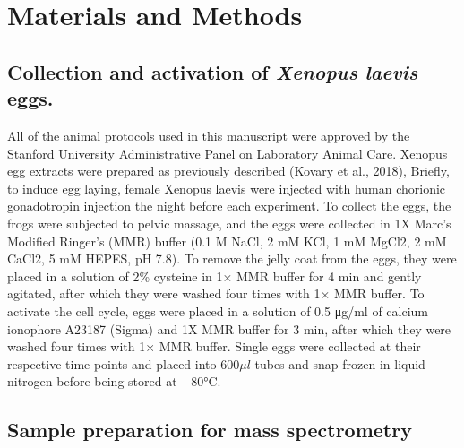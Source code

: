 \section{Materials and Methods} \label{Materials and Methods}

\subsection{Collection and activation of \emph{Xenopus laevis} eggs.}

All of the animal protocols used in this manuscript were approved by the Stanford University Administrative Panel on Laboratory Animal Care. Xenopus egg extracts were prepared as previously described (Kovary et al., 2018), Briefly, to induce egg laying, female Xenopus laevis were injected with human chorionic gonadotropin injection the night before each experiment. To collect the eggs, the frogs were subjected to pelvic massage, and the eggs were collected in 1X Marc’s Modified Ringer’s (MMR) buffer (0.1 M NaCl, 2 mM KCl, 1 mM MgCl2, 2 mM CaCl2, 5 mM HEPES, pH 7.8). To remove the jelly coat from the eggs, they were placed in a solution of 2\% cysteine in 1× MMR buffer for 4 min and gently agitated, after which they were washed four times with 1× MMR buffer. To activate the cell cycle, eggs were placed in a solution of 0.5 μg/ml of calcium ionophore A23187 (Sigma) and 1X MMR buffer for 3 min, after which they were washed four times with 1× MMR buffer. Single eggs were collected at their respective time-points and placed into 600$\mu l$ tubes and snap frozen in liquid nitrogen before being stored at $-80$\si{\degree}C.

\subsection{Sample preparation for mass spectrometry}

